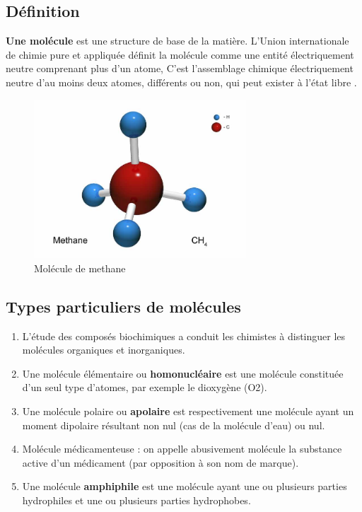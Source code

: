 \documentclass[12pt]{report}
\begin{document}
\subsection{Définition}
\textbf{Une molécule} est une structure de base de la matière. L'Union internationale de chimie pure et appliquée définit la molécule comme une entité électriquement neutre comprenant plus d'un atome,  C'est l'assemblage chimique électriquement neutre d'au moins deux atomes, différents ou non, qui peut exister à l'état libre \cite{ref8} .\\
\begin{figure}[h]
\begin{center}
\includegraphics[width=300]{mol.jpg}
\caption{Molécule de methane}
\end{center}
\end{figure}

\subsection{Types particuliers de molécules}
\begin{enumerate}
\item L'étude des composés biochimiques a conduit les chimistes à distinguer les molécules organiques et inorganiques. 

\item Une molécule élémentaire ou \textbf{homonucléaire } est une molécule constituée d'un seul type d'atomes, par exemple le dioxygène (O2). 

\item Une molécule polaire ou \textbf{apolaire} est respectivement une molécule ayant un moment dipolaire résultant non nul (cas de la molécule d'eau) ou nul.

\item Molécule médicamenteuse : on appelle abusivement molécule la substance active d'un médicament (par opposition à son nom de marque).

\item Une molécule \textbf{amphiphile} est une molécule ayant une ou plusieurs parties hydrophiles et une ou plusieurs parties hydrophobes.

\end{enumerate}
\end{document}
